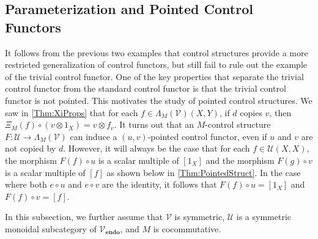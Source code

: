 \subsection{Parameterization and Pointed Control Functors}
%
It follows from the previous two examples that control structures provide a more restricted generalization of control functors, but still fail to rule out the example of the trivial control functor.
One of the key properties that separate the trivial control functor from the standard control functor is that the trivial control functor is not pointed.
This motivates the study of pointed control structures.
We saw in \cref{Thm:XiProps} that for each $f \in \Lambda_M( \mathcal{V} )( X, Y )$, if $d$ copies $v$, then $\Xi_M( f ) \circ ( v \otimes 1_X ) = v \otimes f_v$.
It turns out that an $M$-control structure $F: \mathcal{U} \to \Lambda_M( \mathcal{V} )$ can induce a $( u, v )$-pointed control functor, even if $u$ and $v$ are not copied by $d$.
However, it will always be the case that for each $f \in \mathcal{U}( X, X )$, the morphism $F( f ) \circ u$ is a scalar multiple of $[ 1_X ]$ and the morphism $F( g ) \circ v$ is a scalar multiple of $[ f ]$ as shown below in \cref{Thm:PointedStruct}.
In the case where both $e \circ u$ and $e \circ v$ are the identity, it follows that $F( f ) \circ u = [ 1_X ]$ and $F( f ) \circ v = [ f ]$.

\begin{nota}
    In this subsection, we further assume that $\mathcal{V}$ is symmetric, $\mathcal{U}$ is a symmetric monoidal subcategory of $\mathcal{V}_{\mathbf{endo}}$, and $M$ is cocommutative.
\end{nota}

